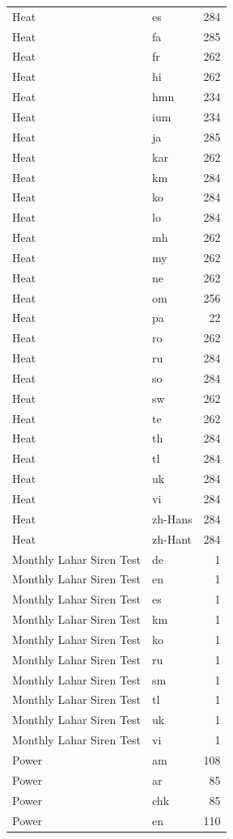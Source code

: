 \begin{longtable}{p{3cm} p{3cm} r}
Heat & es & 284 \\
Heat & fa & 285 \\
Heat & fr & 262 \\
Heat & hi & 262 \\
Heat & hmn & 234 \\
Heat & ium & 234 \\
Heat & ja & 285 \\
Heat & kar & 262 \\
Heat & km & 284 \\
Heat & ko & 284 \\
Heat & lo & 284 \\
Heat & mh & 262 \\
Heat & my & 262 \\
Heat & ne & 262 \\
Heat & om & 256 \\
Heat & pa & 22 \\
Heat & ro & 262 \\
Heat & ru & 284 \\
Heat & so & 284 \\
Heat & sw & 262 \\
Heat & te & 262 \\
Heat & th & 284 \\
Heat & tl & 284 \\
Heat & uk & 284 \\
Heat & vi & 284 \\
Heat & zh-Hans & 284 \\
Heat & zh-Hant & 284 \\
Monthly Lahar Siren Test & de & 1 \\
Monthly Lahar Siren Test & en & 1 \\
Monthly Lahar Siren Test & es & 1 \\
Monthly Lahar Siren Test & km & 1 \\
Monthly Lahar Siren Test & ko & 1 \\
Monthly Lahar Siren Test & ru & 1 \\
Monthly Lahar Siren Test & sm & 1 \\
Monthly Lahar Siren Test & tl & 1 \\
Monthly Lahar Siren Test & uk & 1 \\
Monthly Lahar Siren Test & vi & 1 \\
Power & am & 108 \\
Power & ar & 85 \\
Power & chk & 85 \\
Power & en & 110 \\

\end{longtable}
